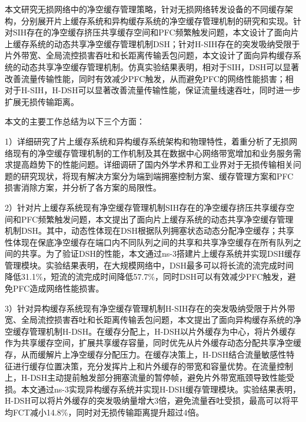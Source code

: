 


本文研究无损网络中的净空缓存管理策略，针对无损网络转发设备的不同缓存架构，分别展开片上缓存系统和异构缓存系统的净空缓存管理机制的研究和实现。针对SIH存在的净空缓存挤压共享缓存空间和PFC频繁触发问题，本文设计了面向片上缓存系统的动态共享净空缓存管理机制DSH；针对H-SIH存在的突发吸纳受限于片外带宽、全局流控损害吞吐和长距离传输丢包问题，本文设计了面向异构缓存系统的动态共享净空缓存管理机制。仿真实验结果表明，相对于SIH，DSH可以显著改善流量传输性能，同时有效减少PFC触发，从而避免PFC的网络性能损害；相对于H-SIH，H-DSH可以显著改善流量传输性能，保证流量线速吞吐，同时进一步扩展无损传输距离。

本文的主要工作总结为以下三个方面：

1）详细研究了片上缓存系统和异构缓存系统架构和物理特性，着重分析了无损网络现有的净空缓存管理机制的工作机制及其在数据中心网络带宽增加和业务服务需求提高趋势下的性能问题。详细调研了国内外学术界和工业界对于无损传输相关问题的研究现状，将现有解决方案分为端到端拥塞控制方案、缓存管理方案和PFC损害消除方案，并分析了各方案的局限性。

2）针对片上缓存系统现有净空缓存管理机制SIH存在的净空缓存挤压共享缓存空间和PFC频繁触发问题，本文提出了面向片上缓存系统的动态共享净空缓存管理机制DSH。其中，动态性体现在DSH根据队列拥塞状态动态分配净空缓存；共享性体现在保底净空缓存在端口内不同队列之间的共享和共享净空缓存在所有队列之间的共享。为了验证DSH的性能，本文通过ns-3搭建片上缓存系统并实现DSH缓存管理模块。实验结果表明，在大规模网络中，DSH最多可以将长流的流完成时间降低31.1\%，短流的流完成时间降低57.7\%，同时DSH可以有效减少PFC触发，避免PFC造成网络性能损害。

3）针对异构缓存系统现有净空缓存管理机制H-SIH存在的突发吸纳受限于片外带宽、全局流控损害吞吐和长距离传输丢包问题，本文提出了面向异构缓存系统的净空缓存管理机制H-DSH。在缓存分配上，H-DSH以片外缓存为中心，将片外缓存作为共享缓存空间，扩展共享缓存容量，同时优先从片外缓存动态分配共享净空缓存，从而缓解片上净空缓存分配压力。在缓存决策上，H-DSH结合流量敏感性特征进行缓存位置决策，充分发挥片上和片外缓存的带宽和容量优势。在流量控制上，H-DSH主动提前触发部分拥塞流量的暂停帧，避免片外带宽瓶颈导致性能受损。本文通过ns-3实现异构缓存系统并实现H-DSH缓存管理模块。实验结果表明，H-DSH可以将片外缓存的突发吸纳量增大3倍，避免流量吞吐受损，最高可以将平均FCT减小14.8\%，同时对无损传输距离提升超过4倍。


